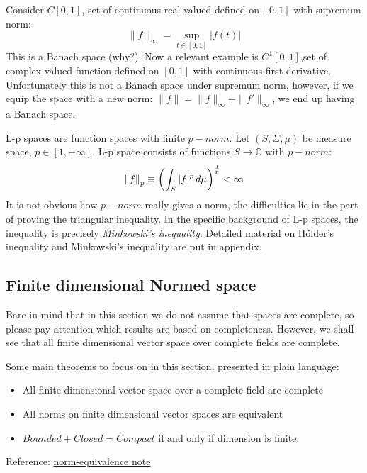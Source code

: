 \documentclass{article}
\begin{document}
\begin{example}\rm\nextline
	Consider $C[0,1]$, set of continuous real-valued defined on $[0,1]$ with supremum norm:
	$$\|f\|_\infty=\sup_{t \in [0,1]} |f(t)|$$ This is a Banach space (why?). Now a relevant example is $C^1[0,1]$,set of complex-valued function defined on $[0,1]$ with continuous first derivative. Unfortunately this is not a Banach space under supremum norm, however, if we equip the space with a new norm: $\|f\|=\|f\|_\infty+\|f'\|_\infty$, we end up having a Banach space.\hfill
\end{example}

\begin{example}[L-p spaces]\rm\label{lp space1}\nextline
	L-p spaces are function spaces with finite $p-norm$. Let $(S,\Sigma,\mu)$ be measure space, $p\in[1,+\infty]$. L-p space consists of functions $S\xrightarrow{}\mathbb{C}$ with $p-norm$:
	$$\left\|{f}\right\|_p\equiv\left(\int_S|f|^p \,d\mu\right)^\frac{1}{p}<\infty$$
	It is not obvious how $p-norm$ really gives a norm, the difficulties lie in the part of proving the triangular inequality. In the specific background of L-p spaces, the inequality is precisely \textit{Minkowski's inequality}. Detailed material on Hölder's inequality and Minkowski's inequality are put in appendix.
\end{example}


\subsection{Finite dimensional Normed space}\label{finite dimensional Banach}  

Bare in mind that in this section we do not assume that spaces are complete, so please pay attention which results are based on completeness. However, we shall see that all finite dimensional vector      space over complete fields are complete.  

Some main theorems to focus on in this section, presented in plain language:
\begin{itemize}
	\item All finite dimensional vector space over a complete field are complete
	\item All norms on finite dimensional vector spaces are equivalent
	\item $Bounded+Closed=Compact$ if and only if dimension is finite.
\end{itemize}
Reference: \href{https://math.mit.edu/~stevenj/18.335/norm-equivalence.pdf}{norm-equivalence note}
\end{document}
